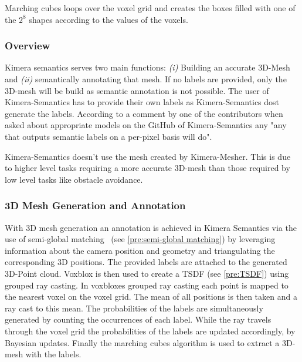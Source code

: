 \documentclass[11pt,a4paper]{article}
\begin{document}
Marching cubes loops over the voxel grid and creates the boxes filled with one of the $2^8$ shapes according to the values of the voxels.

\subsubsection{Overview}
Kimera semantics serves two main functions: \textit{(i)} Building an accurate 3D-Mesh and  \textit{(ii)} semantically annotating that mesh.
If no labels are provided, only the 3D-mesh will be build as semantic annotation is not possible.
The user of Kimera-Semantics has to provide their own labels as Kimera-Semantics dost generate the labels. 
According to a comment by one of the contributors when asked about appropriate models on the GitHub of Kimera-Semantics any "any that outputs semantic labels on a per-pixel basis will do".

Kimera-Semantics doesn't use the mesh created by Kimera-Mesher. 
This is due to higher level tasks requiring a more accurate 3D-mesh than those required by low level tasks like obstacle avoidance.
\subsubsection*{3D Mesh Generation and Annotation}
With 3D mesh generation an annotation is achieved in Kimera Semantics via the use of semi-global matching~\cite{SGM} (see \ref{pre:semi-global matching}) by leveraging information about the camera position and geometry and triangulating the corresponding 3D positions.
The provided labels are attached to the generated 3D-Point cloud. 
Voxblox is then used to create a TSDF (see \ref{pre:TSDF}) using grouped ray casting.
In voxbloxes grouped ray casting each point is mapped to the nearest voxel on the voxel grid. 
The mean of all positions is then taken and a ray cast to this mean. 
The probabilities of the labels are simultaneously generated by counting the occurrences of each label. 
While the ray travels through the voxel grid the probabilities of the labels are updated accordingly, by Bayesian updates. 
Finally the marching cubes algorithm is used to extract a 3D-mesh with the labels.
\end{document}

